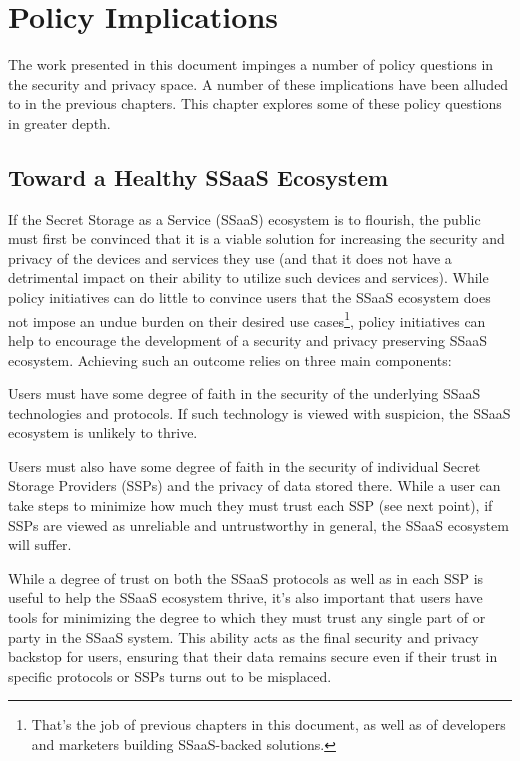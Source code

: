 \chapter{Policy Implications}
\label{chap:policy}

The work presented in this document impinges a number of policy
questions in the security and privacy space. A number of these
implications have been alluded to in the previous chapters. This
chapter explores some of these policy questions in greater depth.

\section{Toward a Healthy SSaaS Ecosystem}

If the Secret Storage as a Service (SSaaS) ecosystem is to flourish,
the public must first be convinced that it is a viable solution for
increasing the security and privacy of the devices and services they
use (and that it does not have a detrimental impact on their ability
to utilize such devices and services). While policy initiatives can do
little to convince users that the SSaaS ecosystem does not impose an
undue burden on their desired use cases\footnote{That's the job of
  previous chapters in this document, as well as of developers and
  marketers building SSaaS-backed solutions.}, policy initiatives can
help to encourage the development of a security and privacy preserving
SSaaS ecosystem. Achieving such an outcome relies on three main
components:

\begin{packed_desc}
\item[Validity of the Secret Storage System:] Users must have some
  degree of faith in the security of the underlying SSaaS technologies
  and protocols. If such technology is viewed with suspicion, the
  SSaaS ecosystem is unlikely to thrive.
\item[Validity of Secret Storage Providers:] Users must also have some
  degree of faith in the security of individual Secret Storage
  Providers (SSPs) and the privacy of data stored there. While a user
  can take steps to minimize how much they must trust each SSP (see
  next point), if SSPs are viewed as unreliable and untrustworthy in
  general, the SSaaS ecosystem will suffer.
\item[Ability to Minimize Trust:] While a degree of trust on both the
  SSaaS protocols as well as in each SSP is useful to help the SSaaS
  ecosystem thrive, it's also important that users have tools for
  minimizing the degree to which they must trust any single part of or
  party in the SSaaS system. This ability acts as the final security
  and privacy backstop for users, ensuring that their data remains
  secure even if their trust in specific protocols or SSPs turns out
  to be misplaced.
\end{packed_desc}

